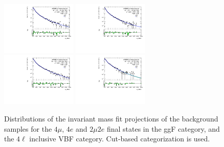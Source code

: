 \begin{figure}[htbp]
    \centering
    \includegraphics[width=0.32\textwidth]{figures/HMHZZ/background/cut_based/bkg_shape_ggZZ_ggF_4mu_180_to_2200_log.pdf}
    \includegraphics[width=0.32\textwidth]{figures/HMHZZ/background/cut_based/bkg_shape_ggZZ_ggF_4e_185_to_2200_log.pdf} \\
    \includegraphics[width=0.32\textwidth]{figures/HMHZZ/background/cut_based/bkg_shape_ggZZ_ggF_2mu2e_185_to_2200_log.pdf}
    \includegraphics[width=0.32\textwidth]{figures/HMHZZ/background/cut_based/bkg_shape_ggZZ_VBF_incl_180_to_2200_log.pdf}
    \caption{Distributions of the \mfl invariant mass fit projections of the \ggZZ background samples for the $4\mu$,
    $4e$ and $2\mu 2e$ final states in the ggF category, and the $4\ell$ inclusive VBF category. 
    Cut-based categorization is used.} 
    \label{fig:ggZZ_m4l_shape_all_cut_based}
\end{figure}

